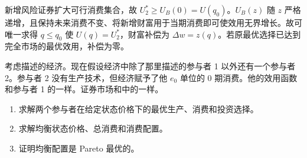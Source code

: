 \begin{solution}[blank-type=manual,blank-vsep=9\baselineskip]
\begin{enumerate}[label=(\alph*)]
新增风险证券扩大可行消费集合，故 $U_2^*\ge U_B(0)=U(q_0)$。$U_B(z)$ 随 $z$ 严格递增，且保持未来消费不变、将新增财富用于当期消费即可使效用无界增长。故可唯一求得 $q\le q_0$ 使 $U(q)=U_2^*$，财富补偿为 $\Delta w=z(q)$。若原最优选择已达到完全市场的最优效用，补偿为零。\qedhere
\end{enumerate}
\end{solution}

\par\noindent\begin{minipage}{\linewidth}
\begin{problem}
 考虑描述的经济。现在假设经济中除了那里描述的参与者 1 以外还有一个参与者 2。参与者 2 没有生产技术，但经济赋予了他 $e_{0}$ 单位的 0 期消费。他的效用函数和参与者 1 的一样。证券市场和中的一样。
\begin{enumerate}[label=(\alph*)]
    \item 求解两个参与者在给定状态价格下的最优生产、消费和投资选择。
    \item 求解均衡状态价格、总消费和消费配置。
    \item 证明均衡配置是 Pareto 最优的。
\end{enumerate}
\end{problem}
\end{minipage}\par
{}
